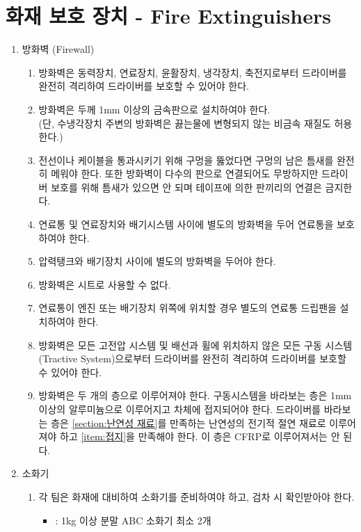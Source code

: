 \documentclass[final,a4paper,10pt]{report}
\begin{document}
\section{화재 보호 장치 - Fire Extinguishers} \label{section:화재 보호 장치}
\begin{enumerate}
  \item 방화벽 (Firewall) \label{item:방화벽}
    \begin{enumerate}
      \item 방화벽은 동력장치, 연료장치, 윤활장치, 냉각장치, 축전지로부터 드라이버를 완전히 격리하여 드라이버를 보호할 수 있어야 한다.
      \item 방화벽은 두께 1mm 이상의 금속판으로 설치하여야 한다.\\
      (단, 수냉각장치 주변의 방화벽은 끓는물에 변형되지 않는 비금속 재질도 허용한다.)
      \item 전선이나 케이블을 통과시키기 위해 구멍을 뚫었다면 구멍의 남은 틈새를 완전히 메워야 한다. 또한 방화벽이 다수의 판으로 연결되어도 무방하지만 드라이버 보호를 위해 틈새가 있으면 안 되며 테이프에 의한 판끼리의 연결은 금지한다.
      \item 연료통 및 연료장치와 배기시스템 사이에 별도의 방화벽을 두어 연료통을 보호하여야 한다.
      \item 압력탱크와 배기장치 사이에 별도의 방화벽을 두어야 한다.
      \item 방화벽은 시트로 사용할 수 없다.
      \item 연료통이 엔진 또는 배기장치 위쪽에 위치할 경우 별도의 연료통 드립팬을 설치하여야 한다.
      \item {} 방화벽은 모든 고전압 시스템 및 배선과 휠에 위치하지 않은 모든 구동 시스템(Tractive System)으로부터 드라이버를 완전히 격리하여 드라이버를 보호할 수 있어야 한다.
      \item {} 방화벽은 두 개의 층으로 이루어져야 한다. 구동시스템을 바라보는 층은 1mm 이상의 알루미늄으로 이루어지고 차체에 접지되어야 한다. 드라이버를 바라보는 층은 \cref{section:난연성 재료}를 만족하는 난연성의 전기적 절연 재료로 이루어져야 하고 \cref{item:접지}을 만족해야 한다. 이 층은 CFRP로 이루어져서는 안 된다. \label{item:e-formula 방화벽}
    \end{enumerate}
    
  \item 소화기
    \begin{enumerate}
      \item 각 팀은 화재에 대비하여 소화기를 준비하여야 하고, 검차 시 확인받아야 한다.
        \begin{itemize}
          \item {}: 1kg 이상 분말 ABC 소화기 최소 2개
          

\end{itemize}
\end{enumerate}
\end{enumerate}
\end{document}
